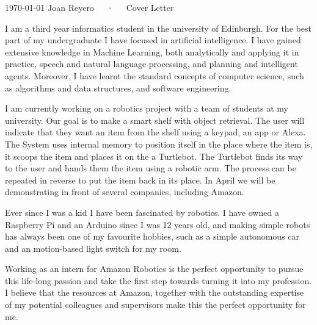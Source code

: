 \documentclass[11pt, a4paper]{awesome-cv}
\begin{document}
\makecvheader[R]

\makecvfooter
  {\today}
  {Joan Reyero~~~·~~~Cover Letter}
  {}

\makelettertitle

\begin{cvletter}

I am a third year informatics student in the university of Edinburgh. For the best part of my undergraduate I have focused in artificial intelligence. I have gained extensive knowledge in Machine Learning, both analytically and applying it in practice, speech and natural language processing, and planning and intelligent agents. Moreover, I have learnt the standard concepts of computer science, such as algorithms and data structures, and software engineering. 

I am currently working on a robotics project with a team of students at my university. Our goal is to make a smart shelf with object retrieval. The user will indicate that they want an item from the shelf using a keypad, an app or Alexa. The System uses internal memory to position itself in the place where the item is, it scoops the item and places it on the a Turtlebot. The Turtlebot finds its way to the user and hands them the item using a robotic arm. The process can be repeated in reverse to put the item back in its place. In April we will be demonstrating in front of several companies, including Amazon.




Ever since I was a kid I have been fascinated by robotics. I have owned a Raspberry Pi and an Arduino since I was 12 years old, and making simple robots has always been one of my favourite hobbies, such as a simple autonomous car and an motion-based light switch for my room.

Working as an intern for Amazon Robotics is the perfect opportunity to pursue this life-long passion and take the first step towards turning it into my profession. I believe that the resources at Amazon, together with the outstanding expertise of my potential colleagues and supervisors make this the perfect opportunity for me.


\end{cvletter}
\end{document}
